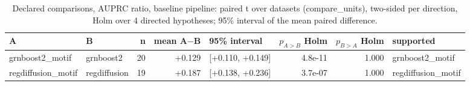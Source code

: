 \begin{table}[H]\centering\small
\caption{Declared comparisons, AUPRC ratio, baseline pipeline: paired t over datasets (compare\_units), two-sided per direction, Holm over 4 directed hypotheses; 95\% interval of the mean paired difference.}
\begin{tabular}{llrrlrrl}\toprule
A & B & n & mean A$-$B & 95\% interval & $p_{A>B}$ Holm & $p_{B>A}$ Holm & supported \\ \midrule
grnboost2\_motif & grnboost2 & 20 & +0.129 & [+0.110, +0.149] & 4.8e-11 & 1.000 & grnboost2\_motif \\
regdiffusion\_motif & regdiffusion & 19 & +0.187 & [+0.138, +0.236] & 3.7e-07 & 1.000 & regdiffusion\_motif \\
\bottomrule\end{tabular}\end{table}

